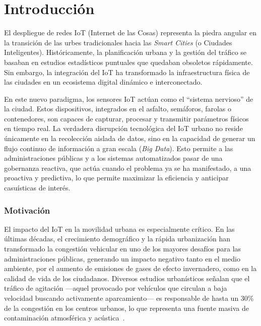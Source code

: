 \chapter{Introducción}
\label{sec:intro}

El despliegue de redes IoT (Internet de las Cosas) representa la piedra angular en la transición de las urbes tradicionales hacia las \textit{Smart Cities} (o Ciudades Inteligentes). Históricamente, la planificación urbana y la gestión del tráfico se basaban en estudios estadísticos puntuales que quedaban obsoletos rápidamente. Sin embargo, la integración del IoT ha transformado la infraestructura física de las ciudades en un ecosistema digital dinámico e interconectado.

En este nuevo paradigma, los sensores IoT actúan como el ``sistema nervioso'' de la ciudad. Estos dispositivos, integrados en el asfalto, semáforos, farolas o contenedores, son capaces de capturar, procesar y transmitir parámetros físicos en tiempo real. La verdadera disrupción tecnológica del IoT urbano no reside únicamente en la recolección aislada de datos, sino en la capacidad de generar un flujo continuo de información a gran escala (\textit{Big Data}). Esto permite a las administraciones públicas y a los sistemas automatizados pasar de una gobernanza reactiva, que actúa cuando el problema ya se ha manifestado, a una proactiva y predictiva, lo que permite maximizar la eficiencia y anticipar casuísticas de interés.

\subsection{Motivación}
\label{subsec:motivacion}
El impacto del IoT en la movilidad urbana es especialmente crítico. En las últimas décadas, el crecimiento demográfico y la rápida urbanización han transformado la congestión vehicular en uno de los mayores desafíos para las administraciones públicas, generando un impacto negativo tanto en el medio ambiente, por el aumento de emisiones de gases de efecto invernadero, como en la calidad de vida de los ciudadanos. Diversos estudios urbanísticos señalan que el tráfico de agitación ---aquel provocado por vehículos que circulan a baja velocidad buscando activamente aparcamiento--- es responsable de hasta un 30\% de la congestión en los centros urbanos, lo que representa una fuente masiva de contaminación atmosférica y acústica~\cite{shoup2006cruising}.

